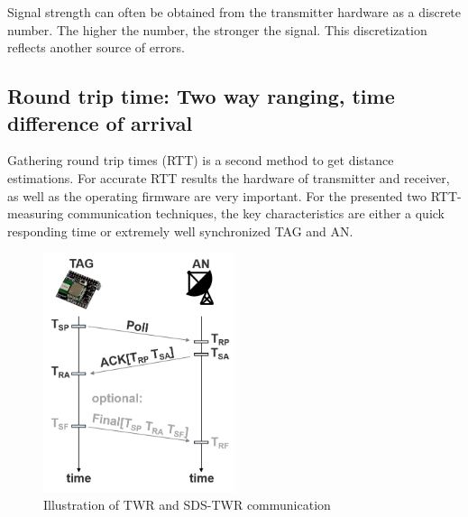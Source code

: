 Signal strength can often be obtained from the transmitter hardware as a discrete number. The higher the number, the stronger the signal. This discretization reflects another source of errors. 

\subsection{Round trip time: Two way ranging, time difference of arrival}
Gathering round trip times (RTT) is a second method to get distance estimations. For accurate RTT results the hardware of transmitter and receiver, as well as the operating firmware are very important. For the presented two RTT-measuring communication techniques, the key characteristics are either a quick responding time or extremely well synchronized TAG and AN.

\begin{figure}[th]
\centering
\includegraphics[width=0.5\textwidth]{Figures/two_way_ranging}
\decoRule
\caption[Two Way Ranging]{Illustration of TWR and SDS-TWR communication}
\label{fig:two_way_ranging}
\end{figure}

